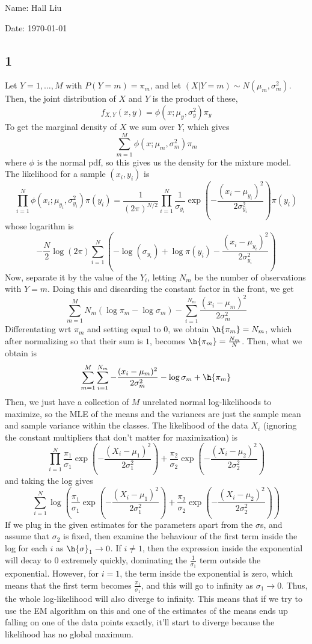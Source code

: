 \documentclass{article}
\begin{document}
Name: Hall Liu

Date: \today 
\vspace{1.5cm}
\subsection*{1}
Let $Y=1,\ldots,M$ with $P(Y=m)=\pi_m$, and let $(X|Y=m)\sim N(\mu_m, \sigma_m^2)$. Then, the joint distribution of $X$ and $Y$ is the product of these,
\[f_{X,Y}(x,y)=\phi(x;\mu_y,\sigma_y^2)\pi_y\]
To get the marginal density of $X$ we sum over $Y$, which gives
\[\sum_{m=1}^M\phi(x;\mu_m,\sigma_m^2)\pi_m\]
where $\phi$ is the normal pdf, so this gives us the density for the mixture model.
The likelihood for a sample $(x_i,y_i)$ is 
\[\prod_{i=1}^N\phi(x_i;\mu_{y_i}, \sigma_{y_i}^2)\pi(y_i)=\frac{1}{(2\pi)^{N/2}}\prod_{i=1}^N\frac{1}{\sigma_{y_i}}\exp\left(-\frac{(x_i-\mu_{y_i})^2}{2\sigma_{y_i}^2}\right)\pi(y_i)\]
whose logarithm is 
\[-\frac{N}{2}\log(2\pi)\sum_{i=1}^N\left(-\log(\sigma_{y_i})+\log\pi(y_i)-\frac{(x_i-\mu_{y_i})^2}{2\sigma_{y_i}^2}\right)\]
Now, separate it by the value of the $Y_i$, letting $N_m$ be the number of observations with $Y=m$. Doing this and discarding the constant factor in the front, we get
\[\sum_{m=1}^MN_m\left(\log\pi_m-\log\sigma_m\right)-\sum_{i=1}^{N_m}\frac{(x_i-\mu_m)^2}{2\sigma_m^2}\]
Differentating wrt $\pi_m$ and setting equal to $0$, we obtain $\h{\pi_m}=N_m$, which after normalizing so that their sum is $1$, becomes $\h{\pi_m}=\frac{N_m}{N}$. Then, what we obtain is
\[\sum_{m=1}^M\sum_{i=1}^{N_m}-\frac{(x_i-\mu_m)^2}{2\sigma_m^2}-\log\sigma_m+\h{\pi_m}\]
Then, we just have a collection of $M$ unrelated normal log-likelihoods to maximize, so the MLE of the means and the variances are just the sample mean and sample variance within the classes.
The likelihood of the data $X_i$ (ignoring the constant multipliers that don't matter for maximization) is
\[\prod_{i=1}^N\frac{\pi_1}{\sigma_1}\exp\left(-\frac{(X_i-\mu_1)^2}{2\sigma_1^2}\right)+\frac{\pi_2}{\sigma_2}\exp\left(-\frac{(X_i-\mu_2)^2}{2\sigma_2^2}\right)\]
and taking the log gives
\[\sum_{i=1}^N\log\left(\frac{\pi_1}{\sigma_1}\exp\left(-\frac{(X_i-\mu_1)^2}{2\sigma_1^2}\right)+\frac{\pi_2}{\sigma_2}\exp\left(-\frac{(X_i-\mu_2)^2}{2\sigma_2^2}\right)\right)\]
If we plug in the given estimates for the parameters apart from the $\sigma$s, and assume that $\sigma_2$ is fixed, then examine the behaviour of the first term inside the log for each $i$ as $\h{\sigma}_1\to0$. If $i\neq1$, then the expression inside the exponential will decay to $0$ extremely quickly, dominating the $\frac{1}{\sigma_1}$ term outside the exponential. However, for $i=1$, the term inside the exponential is zero, which means that the first term becomes $\frac{\pi_1}{\sigma_1}$, and this will go to infinity as $\sigma_1\to0$. Thus, the whole log-likelihood will also diverge to infinity. This means that if we try to use the EM algorithm on this and one of the estimates of the means ends up falling on one of the data points exactly, it'll start to diverge because the likelihood has no global maximum.
\end{document}
